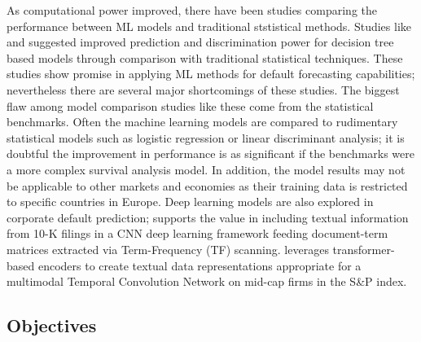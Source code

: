 \documentclass[10pt]{article}
\begin{document}
\begin{multicols*}{2}
As computational power improved, there have been studies comparing the performance between ML models and traditional ststistical methods. Studies like \citep{barboza} and \citep{sigrist} suggested improved prediction and discrimination power for decision tree based models through comparison with traditional statistical techniques. These studies show promise in applying ML methods for default forecasting capabilities; nevertheless there are several major shortcomings of these studies. 
The biggest flaw among model comparison studies like these come from the statistical benchmarks. Often the machine learning models are compared to rudimentary statistical models such as logistic regression or linear discriminant analysis; it is doubtful the improvement in performance is as significant if the benchmarks were a more complex survival analysis model. In addition, the model results may not be applicable to other markets and economies as their training data is restricted to specific countries in Europe.
Deep learning models are also explored in corporate default prediction; \citep{mai} supports the value in including textual information from 10-K filings in a CNN deep learning framework feeding document-term matrices extracted via Term-Frequency (TF) scanning. \citep{korangi} leverages transformer-based encoders to create textual data representations appropriate for a multimodal Temporal Convolution Network on mid-cap firms in the S\&P index. 

\subsection{Objectives}\label{objectives}


\end{multicols*}
\end{document}
